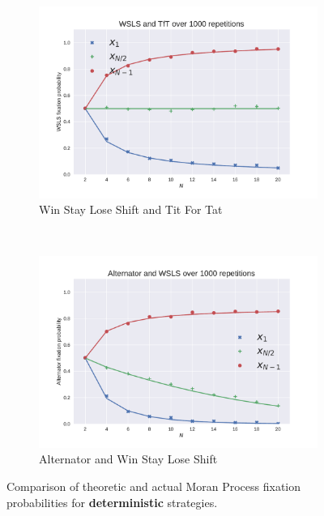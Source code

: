 \documentclass[10pt,journal]{IEEEtran}
\begin{document}
\begin{figure}[!hbtp]
    \begin{subfigure}[t]{.5\columnwidth}
        \centering
        \includegraphics[width=.95\columnwidth]{img/WSLS_v_TfT.pdf}
        \caption{Win Stay Lose Shift and Tit For Tat}
    \end{subfigure}%
    ~
    \begin{subfigure}[t]{.5\columnwidth}
        \centering
        \includegraphics[width=.95\columnwidth]{img/Alternator_v_WSLS.pdf}
        \caption{Alternator and Win Stay Lose Shift}
    \end{subfigure}%
    \caption{Comparison of theoretic and actual Moran Process fixation
             probabilities for \textbf{deterministic} strategies.}
    \label{fig:comparison_deterministic}
\end{figure}
\end{document}
